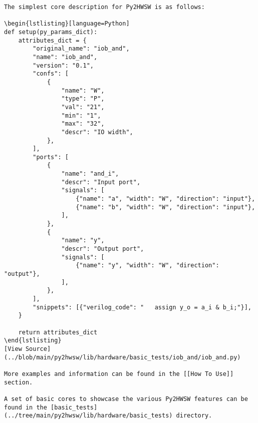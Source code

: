 %

\begin{verbatim}
The simplest core description for Py2HWSW is as follows:

\begin{lstlisting}[language=Python]
def setup(py_params_dict):
    attributes_dict = {
        "original_name": "iob_and",
        "name": "iob_and",
        "version": "0.1",
        "confs": [
            {
                "name": "W",
                "type": "P",
                "val": "21",
                "min": "1",
                "max": "32",
                "descr": "IO width",
            },
        ],
        "ports": [
            {
                "name": "and_i",
                "descr": "Input port",
                "signals": [
                    {"name": "a", "width": "W", "direction": "input"},
                    {"name": "b", "width": "W", "direction": "input"},
                ],
            },
            {
                "name": "y",
                "descr": "Output port",
                "signals": [
                    {"name": "y", "width": "W", "direction": "output"},
                ],
            },
        ],
        "snippets": [{"verilog_code": "   assign y_o = a_i & b_i;"}],
    }

    return attributes_dict
\end{lstlisting}
[View Source](../blob/main/py2hwsw/lib/hardware/basic_tests/iob_and/iob_and.py)

More examples and information can be found in the [[How To Use]] section.

A set of basic cores to showcase the various Py2HWSW features can be found in the [basic_tests](../tree/main/py2hwsw/lib/hardware/basic_tests) directory.
\end{verbatim}
